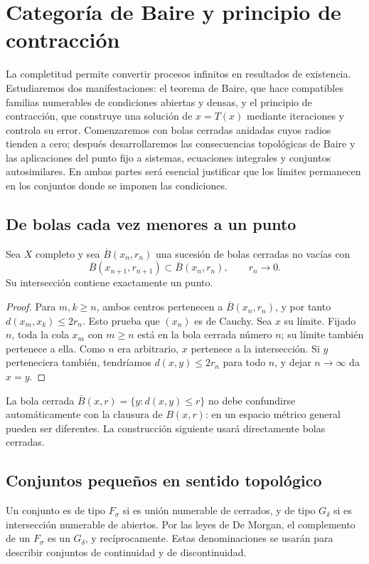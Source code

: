 \chapter{Categoría de Baire y principio de contracción}\label{cap:nuevo04}\label{chap:10}\label{chap:11}
La completitud permite convertir procesos infinitos en resultados de existencia. Estudiaremos dos manifestaciones: el teorema de Baire, que hace compatibles familias numerables de condiciones abiertas y densas, y el principio de contracción, que construye una solución de $x=T(x)$ mediante iteraciones y controla su error. Comenzaremos con bolas cerradas anidadas cuyos radios tienden a cero; después desarrollaremos las consecuencias topológicas de Baire y las aplicaciones del punto fijo a sistemas, ecuaciones integrales y conjuntos autosimilares. En ambas partes será esencial justificar que los límites permanecen en los conjuntos donde se imponen las condiciones.

\section{De bolas cada vez menores a un punto}
\label{lectura:10}

\begin{teorema}\label{ch10:bolas}
Sea $X$ completo y sea $\overline B(x_n,r_n)$ una sucesión de bolas cerradas no vacías con
\[
 \overline B(x_{n+1},r_{n+1})\subset\overline B(x_n,r_n),
 \qquad r_n\longrightarrow0.
\]
Su intersección contiene exactamente un punto.
\end{teorema}
\begin{proof}
Para $m,k\geq n$, ambos centros pertenecen a $\overline B(x_n,r_n)$, y por tanto $d(x_m,x_k)\leq2r_n$. Esto prueba que $(x_n)$ es de Cauchy. Sea $x$ su límite. Fijado $n$, toda la cola $x_m$ con $m\geq n$ está en la bola cerrada número $n$; su límite también pertenece a ella. Como $n$ era arbitrario, $x$ pertenece a la intersección. Si $y$ perteneciera también, tendríamos $d(x,y)\leq2r_n$ para todo $n$, y dejar $n\to\infty$ da $x=y$.
\end{proof}
La bola cerrada $\overline B(x,r)=\{y:d(x,y)\leq r\}$ no debe confundirse automáticamente con la clausura de $B(x,r)$: en un espacio métrico general pueden ser diferentes. La construcción siguiente usará directamente bolas cerradas.

\section{Conjuntos pequeños en sentido topológico}
\begin{definicion}
Un conjunto es de tipo $F_\sigma$ si es unión numerable de cerrados, y de tipo $G_\delta$ si es intersección numerable de abiertos. Por las leyes de De Morgan, el complemento de un $F_\sigma$ es un $G_\delta$, y recíprocamente. Estas denominaciones se usarán para describir conjuntos de continuidad y de discontinuidad.
\end{definicion}



